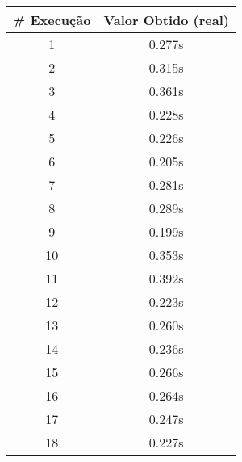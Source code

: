 \documentclass[11pt]{article}
\begin{document}
\begin{table}[!h]
\begin{center}
\begin{minipage}{0.48\textwidth}
\begin{tabular}{| c | c |}
			\hline
				\textbf{\# Execução} &  \textbf{Valor Obtido (real)} \\ \hline
				1 & 0.277s \\ \hline
				2 & 0.315s \\ \hline
				3 & 0.361s \\ \hline
				4 & 0.228s \\ \hline
				5 & 0.226s \\ \hline
				6 & 0.205s \\ \hline
				7 & 0.281s \\ \hline
				8 & 0.289s \\ \hline
				9 & 0.199s \\ \hline
				10 & 0.353s \\ \hline
				11 & 0.392s \\ \hline
				12 & 0.223s \\ \hline
				13 & 0.260s \\ \hline
				14 & 0.236s \\ \hline
				15 & 0.266s \\ \hline
				16 & 0.264s \\ \hline
				17 & 0.247s \\ \hline
				18 & 0.227s \\ \hline
			\end{tabular}
		\end{minipage}
	\end{center}
\end{table}
\end{document}
